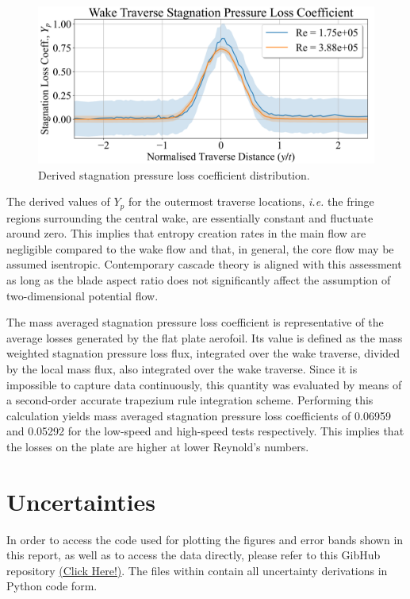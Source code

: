 \documentclass[11pt,a4paper,twocolumn]{article}
\begin{document}
\begin{figure}[!ht]
{\centering
\includegraphics[width = \columnwidth]{exp_3_stag_loss_coefficient.png}
\caption{Derived stagnation pressure loss coefficient distribution.}
\label{exp_3_fig2}}
\end{figure}

The derived values of $Y_p$ for the outermost traverse locations, \textit{i.e.} the fringe regions surrounding the central wake, are essentially constant and fluctuate around zero. This implies that entropy creation rates in the main flow are negligible compared to the wake flow and that, in general, the core flow may be assumed isentropic. Contemporary cascade theory is aligned with this assessment as long as the blade aspect ratio does not significantly affect the assumption of two-dimensional potential flow. 

The mass averaged stagnation pressure loss coefficient is representative of the average losses generated by the flat plate aerofoil. Its value is defined as the mass weighted stagnation pressure loss flux, integrated over the wake traverse, divided by the local mass flux, also integrated over the wake traverse. Since it is impossible to capture data continuously, this quantity was evaluated by means of a second-order accurate trapezium rule integration scheme. Performing this calculation yields mass averaged stagnation pressure loss coefficients of 0.06959  and 0.05292 for the low-speed and high-speed tests respectively. This implies that the losses on the plate are higher at lower Reynold’s numbers. 

\section{Uncertainties}
In order to access the code used for plotting the figures and error bands shown in this report, as well as to access the data directly, please refer to this GibHub repository \href{https://github.com/RobertMichaelSales/FPP3-Interim-Report}{(Click Here!)}. The files within contain all uncertainty derivations in Python code form.
\end{document}

